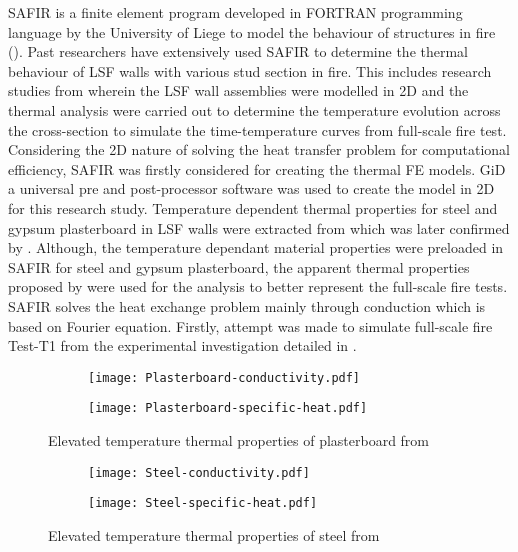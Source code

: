SAFIR is a finite element program developed in FORTRAN programming language by the University of Liege to model the behaviour of structures in fire (\citet{safir2017}). Past researchers have extensively used SAFIR to determine the thermal behaviour of LSF walls with various stud section in fire. This includes research studies from \citet{Poologanathan2012,Keerthan2012a,Keerthan2013} wherein the LSF wall assemblies were modelled in 2D and the thermal analysis were carried out to determine the temperature evolution across the cross-section to simulate the time-temperature curves from full-scale fire test. Considering the 2D nature of solving the heat transfer problem for computational efficiency, SAFIR was firstly considered for creating the thermal FE models. GiD a universal pre and post-processor software was used to create the model in 2D for this research study. Temperature dependent thermal properties for steel and gypsum plasterboard in LSF walls were extracted from \citet{Maneesha2018} which was later confirmed by \citet{Steau2020}. Although, the temperature dependant material properties were preloaded in SAFIR for steel and gypsum plasterboard, the apparent thermal properties proposed by \citet{Maneesha2018} were used for the analysis to better represent the full-scale fire tests. SAFIR solves the heat exchange problem mainly through conduction which is based on Fourier equation. Firstly, attempt was made to simulate full-scale fire Test-T1 from the experimental investigation detailed in . 
\begin{figure}[!htbp]
	\centering
	\begin{subfigure}[b]{0.6\textwidth}
		\centering
		\texttt{[image: Plasterboard-conductivity.pdf]}
		\caption{}
		\label{subfig:Plasterboard-conductivity}
	\end{subfigure}
	\begin{subfigure}[b]{0.6\textwidth}
		\centering
		\texttt{[image: Plasterboard-specific-heat.pdf]}
		\caption{}
		\label{subfig:Plasterboard-specific-heat}
	\end{subfigure}
	   \caption{Elevated temperature thermal properties of plasterboard from \citet{Maneesha2018}}
	   \label{fig:plasterboard-thermal}
\end{figure}
\begin{figure}[!htbp]
	\centering
	\begin{subfigure}[b]{0.6\textwidth}
		\centering
		\texttt{[image: Steel-conductivity.pdf]}
		\caption{}
		\label{subfig:Steel-conductivity}
	\end{subfigure}
	\begin{subfigure}[b]{0.6\textwidth}
		\centering
		\texttt{[image: Steel-specific-heat.pdf]}
		\caption{}
		\label{subfig:Steel-specific-heat}
	\end{subfigure}
	   \caption{Elevated temperature thermal properties of steel from \citet{Maneesha2018}}
	   \label{fig:Steel-thermal}
\end{figure}
